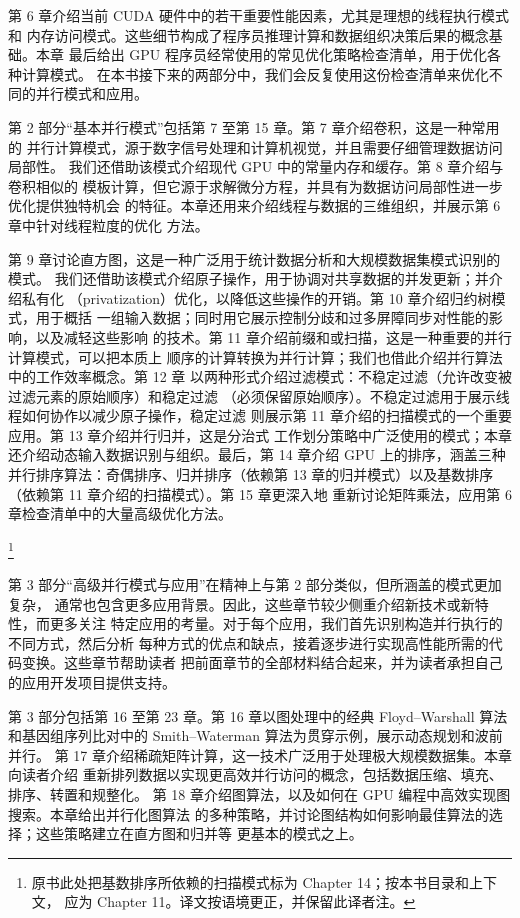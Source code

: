 第 6 章介绍当前 CUDA 硬件中的若干重要性能因素，尤其是理想的线程执行模式和
内存访问模式。这些细节构成了程序员推理计算和数据组织决策后果的概念基础。本章
最后给出 GPU 程序员经常使用的常见优化策略检查清单，用于优化各种计算模式。
在本书接下来的两部分中，我们会反复使用这份检查清单来优化不同的并行模式和应用。

第 2 部分“基本并行模式”包括第 7 至第 15 章。第 7 章介绍卷积，这是一种常用的
并行计算模式，源于数字信号处理和计算机视觉，并且需要仔细管理数据访问局部性。
我们还借助该模式介绍现代 GPU 中的常量内存和缓存。第 8 章介绍与卷积相似的
模板计算，但它源于求解微分方程，并具有为数据访问局部性进一步优化提供独特机会
的特征。本章还用来介绍线程与数据的三维组织，并展示第 6 章中针对线程粒度的优化
方法。

第 9 章讨论直方图，这是一种广泛用于统计数据分析和大规模数据集模式识别的模式。
我们还借助该模式介绍原子操作，用于协调对共享数据的并发更新；并介绍私有化
（privatization）优化，以降低这些操作的开销。第 10 章介绍归约树模式，用于概括
一组输入数据；同时用它展示控制分歧和过多屏障同步对性能的影响，以及减轻这些影响
的技术。第 11 章介绍前缀和或扫描，这是一种重要的并行计算模式，可以把本质上
顺序的计算转换为并行计算；我们也借此介绍并行算法中的工作效率概念。第 12 章
以两种形式介绍过滤模式：不稳定过滤（允许改变被过滤元素的原始顺序）和稳定过滤
（必须保留原始顺序）。不稳定过滤用于展示线程如何协作以减少原子操作，稳定过滤
则展示第 11 章介绍的扫描模式的一个重要应用。第 13 章介绍并行归并，这是分治式
工作划分策略中广泛使用的模式；本章还介绍动态输入数据识别与组织。最后，第
14 章介绍 GPU 上的排序，涵盖三种并行排序算法：奇偶排序、归并排序（依赖第 13
章的归并模式）以及基数排序（依赖第 11 章介绍的扫描模式）。第 15 章更深入地
重新讨论矩阵乘法，应用第 6 章检查清单中的大量高级优化方法。

\footnote{原书此处把基数排序所依赖的扫描模式标为 Chapter 14；按本书目录和上下文，
应为 Chapter 11。译文按语境更正，并保留此译者注。}

第 3 部分“高级并行模式与应用”在精神上与第 2 部分类似，但所涵盖的模式更加复杂，
通常也包含更多应用背景。因此，这些章节较少侧重介绍新技术或新特性，而更多关注
特定应用的考量。对于每个应用，我们首先识别构造并行执行的不同方式，然后分析
每种方式的优点和缺点，接着逐步进行实现高性能所需的代码变换。这些章节帮助读者
把前面章节的全部材料结合起来，并为读者承担自己的应用开发项目提供支持。

第 3 部分包括第 16 至第 23 章。第 16 章以图处理中的经典 Floyd--Warshall 算法
和基因组序列比对中的 Smith--Waterman 算法为贯穿示例，展示动态规划和波前并行。
第 17 章介绍稀疏矩阵计算，这一技术广泛用于处理极大规模数据集。本章向读者介绍
重新排列数据以实现更高效并行访问的概念，包括数据压缩、填充、排序、转置和规整化。
第 18 章介绍图算法，以及如何在 GPU 编程中高效实现图搜索。本章给出并行化图算法
的多种策略，并讨论图结构如何影响最佳算法的选择；这些策略建立在直方图和归并等
更基本的模式之上。


